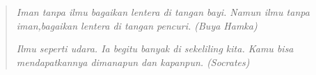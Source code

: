 \chapter*{}


\vspace*{\fill}

\begin{quote}
\begin{flushright}
\begin{small}
\textit{Iman tanpa ilmu bagaikan lentera di tangan bayi. Namun ilmu tanpa iman,bagaikan lentera di tangan pencuri. (Buya Hamka)\\}

\vspace{2cm}
\textit{Ilmu seperti udara. Ia begitu banyak di sekeliling kita. Kamu bisa mendapatkannya dimanapun dan kapanpun. (Socrates)\\}
\end{small}
\end{flushright}
\end{quote}


